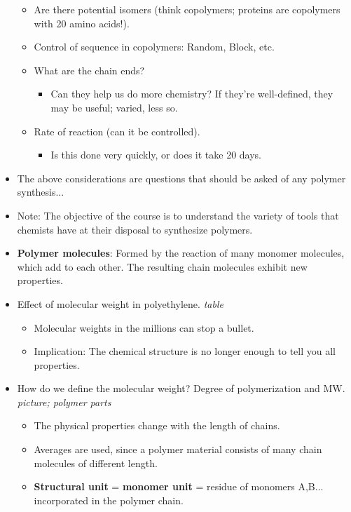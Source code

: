 \documentclass[../notes.tex]{subfiles}
\begin{document}
\begin{itemize}
\begin{itemize}
        \item Are there potential isomers (think copolymers; proteins are copolymers with 20 amino acids!).
        \item Control of sequence in copolymers: Random, Block, etc.
        \item What are the chain ends?
        \begin{itemize}
            \item Can they help us do more chemistry? If they're well-defined, they may be useful; varied, less so.
        \end{itemize}
        \item Rate of reaction (can it be controlled).
        \begin{itemize}
            \item Is this done very quickly, or does it take 20 days.
        \end{itemize}
    \end{itemize}
    \item The above considerations are questions that should be asked of any polymer synthesis...
    \item Note: The objective of the course is to understand the variety of tools that chemists have at their disposal to synthesize polymers.
    \item \textbf{Polymer molecules}: Formed by the reaction of many monomer molecules, which add to each other. The resulting chain molecules exhibit new properties.
    \item Effect of molecular weight in polyethylene.
    \emph{table}
    \begin{itemize}
        \item Molecular weights in the millions can stop a bullet.
        \item Implication: The chemical structure is no longer enough to tell you all properties.
    \end{itemize}
    \item How do we define the molecular weight? Degree of polymerization and MW.
    \emph{picture; polymer parts}
    \begin{itemize}
        \item The physical properties change with the length of chains.
        \item Averages are used, since a polymer material consists of many chain molecules of different length.
        \item \textbf{Structural unit} = \textbf{monomer unit} = residue of monomers A,B... incorporated in the polymer chain.

\end{itemize}
\end{itemize}
\end{document}
